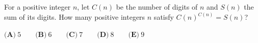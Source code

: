 For a positive integer $n$, let $C(n)$ be the number of digits of $n$ and $S(n)$ the sum of its digits. How many positive integers $n$ satisfy $C(n)^{C(n)}=S(n)$?

$\textbf{(A)}\ 5\qquad\textbf{(B)}\ 6\qquad\textbf{(C)}\ 7\qquad\textbf{(D)}\ 8\qquad\textbf{(E)}\ 9$
